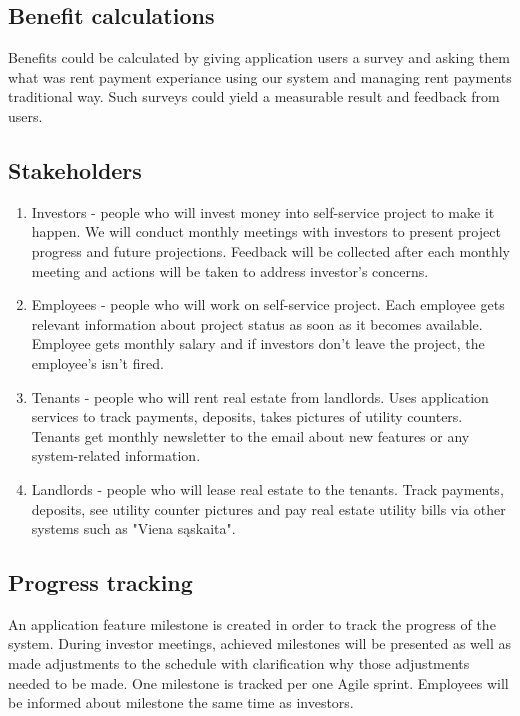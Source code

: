 \documentclass{VUMIFPSkursinis}
\begin{document}
	\subsection{Benefit calculations}
		Benefits could be calculated by giving application users a survey and asking them what was rent payment experiance using our system and managing rent payments traditional way.
		Such surveys could yield a measurable result and feedback from users.

	\subsection{Stakeholders}
		\begin{enumerate}
			\item{Investors - people who will invest money into self-service project to make it happen. 
				We will conduct monthly meetings with investors to present project progress and future projections.
				Feedback will be collected after each monthly meeting and actions will be taken to address investor's concerns.}
			\item{Employees - people who will work on self-service project.
				Each employee gets relevant information about project status as soon as it becomes available.
				Employee gets monthly salary and if investors don't leave the project, the employee's isn't fired.}
			\item{Tenants - people who will rent real estate from landlords.
					Uses application services to track payments, deposits, takes pictures of utility counters.
					Tenants get monthly newsletter to the email about new features or any system-related information.}
			\item{Landlords - people who will lease real estate to the tenants.
					Track payments, deposits, see utility counter pictures and pay real estate utility bills via other systems such as "Viena sąskaita".}
		\end{enumerate}

	\subsection{Progress tracking}
		An application feature milestone is created in order to track the progress of the system.
		During investor meetings, achieved milestones will be presented as well as made adjustments to the schedule with clarification why those adjustments needed to be made.
		One milestone is tracked per one Agile sprint.
		Employees will be informed about milestone the same time as investors.
\end{document}
